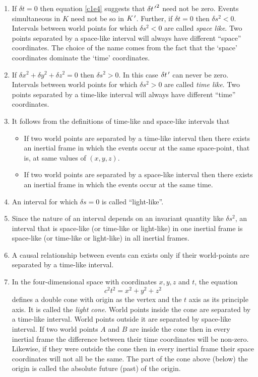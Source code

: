 \begin{enumerate}
\item If $\delta t = 0$ then equation \eqref{c1e4} suggests that 
$\delta{t^{\,\prime}}^2$ need not be zero. Events simultaneous in $K$ need not be so 
in $K^{\,\prime}$. Further, if $\delta t = 0$ then $\delta s^2 < 0$. Intervals between 
world points for which $\delta s^2 < 0$ are called \emph{space like}. Two 
points separated by a space-like interval will always have different ``space'' 
coordinates. The choice of the name comes from the fact that the `space' 
coordinates dominate the `time' coordinates.

\item If $\delta x^2 + \delta y^2 + \delta z^2 = 0$ then $\delta s^2 > 0$. In 
this case $\delta t^{\,\prime}$ can never be zero. Intervals between world points for 
which $\delta s^2 > 0$ are called \emph{time like}. Two points separated by a 
time-like interval will always have different ``time'' coordinates.

\item It follows from the definitions of time-like and space-like intervals that
\begin{itemize}
\item If two world points are separated by a time-like interval then there 
exists an inertial frame in which the events occur at the same space-point, 
that is, at same values of $(x, y, z)$.
\item If two world points are separated by a space-like interval then there 
exists an inertial frame in which the events occur at the same time.
\end{itemize}

\item An interval for which $\delta s = 0$ is called ``light-like''.

\item Since the nature of an interval depends on an invariant quantity like
$\delta s^2$, an interval that is space-like (or time-like or light-like) in one
inertial frame is space-like (or time-like or light-like) in all inertial 
frames.

\item A causal relationship between events can exists only if their world-points
are separated by a time-like interval.

\item In the four-dimensional space with coordinates $x, y, z$ and $t$, the 
equation
\begin{equation}\label{c1e6}
c^2t^2 = x^2 + y^2 + z^2
\end{equation}
defines a double cone with origin as the vertex and the $t$ axis as its 
principle axis. It is called the \emph{light cone}. 
World points inside the cone are separated by a time-like interval. World
points outside it are separated by space-like interval. If two world points $A$
and $B$ are inside the cone then in every inertial frame the difference between
their time coordinates will be non-zero. Likewise, if they were outside the cone
then in every inertial frame their space coordinates will not all be the same.
The part of the cone above (below) the origin is called the absolute future 
(past) of the origin.


\end{enumerate}
